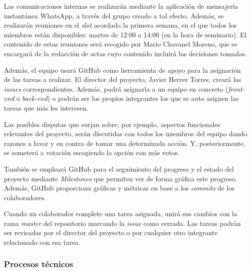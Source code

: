 \documentclass{article}
\begin{document}




Las comunicaciones internas se realizarán mediante la aplicación de mensajería instantánea WhatsApp, a través del grupo creado a tal efecto. Además, se realizarán reuniones en el \textit{slot} acordado la primera semana, en el que todos los miembros están disponibles: martes de 12:00 a 14:00 (en la hora de seminario). El contenido de estas reuniones será recogido por Mario Chavanel Moreno, que se encargará de la redacción de actas cuyo contenido incluirá las decisiones tomadas.

Además, el equipo usará GitHub como herramienta de apoyo para la asignación de las tareas a realizar. El director del proyecto, Javier Herrer Torres, creará las \textit{issues} correspondientes. Además, podrá asignarla a un equipo en concreto (\textit{front-end} o \textit{back-end}) o podrán ser los propios integrantes los que se auto asignen las tareas que más les interesen.

Las posibles disputas que surjan sobre, por ejemplo, aspectos funcionales relevantes del proyecto, serán discutidas con todos los miembros del equipo dando razones a favor y en contra de tomar una determinada acción. Y, posteriormente, se someterá a votación escogiendo la opción con más votos.

También se empleará GitHub para el seguimiento del progreso y el estado del proyecto mediante \textit{Milestones} que permiten ver de forma gráfica este progreso. Además, GitHub proporciona gráficas y métricas en base a los \textit{commits} de los colaboradores.

Cuando un colaborador complete una tarea asignada, unirá sus cambios con la rama \textit{master} del repositorio marcando la \textit{issue} como cerrada. Las tareas podrán ser revisadas por el director del proyecto o por cualquier otro integrante relacionado con esa tarea.

\subsubsection{Procesos técnicos}
\end{document}
